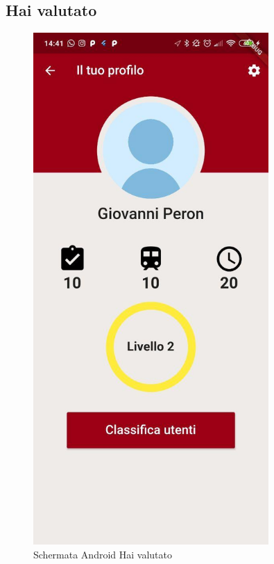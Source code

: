 \subsection{Hai valutato}
\vspace{-\parskip}
\begin{minipage}{0.45\textwidth}
	\begin{figure}[H]
		\centering
		\includegraphics[width=0.8\textwidth]{immagini/profile.jpg}
		\caption{Schermata Android Hai valutato}
	\end{figure}
\end{minipage}
